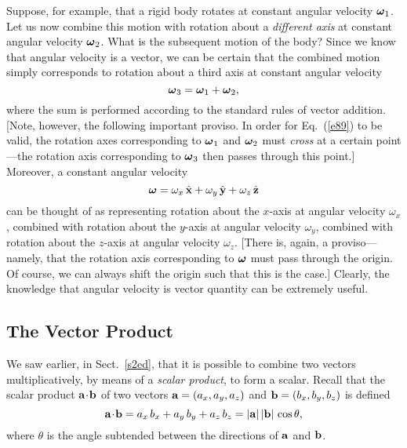 Suppose, for example, that a rigid body rotates at constant angular velocity $\mbox{\boldmath$\omega$}_1$.
Let us now combine this motion with rotation about a {\em different axis} at constant
angular velocity $\mbox{\boldmath$\omega$}_2$. What is the subsequent motion of the body? Since we know
that angular velocity is a vector, we can be certain that the combined motion simply
corresponds to rotation about a third axis at constant angular velocity
\begin{equation}
\mbox{\boldmath$\omega$}_3 = \mbox{\boldmath$\omega$}_1 + \mbox{\boldmath$\omega$}_2,\label{e89}
\end{equation}
where the sum is performed according to the standard rules of vector addition. [Note, however,
the following important proviso. In order for Eq.~(\ref{e89}) to be valid, the rotation
axes corresponding to $\mbox{\boldmath$\omega$}_1$ and $\mbox{\boldmath$\omega$}_2$ must {\em cross} at a certain
point---the rotation axis corresponding to $\mbox{\boldmath$\omega$}_3$ then passes through this point.]
 Moreover,
a  constant angular velocity
\begin{equation}
\mbox{\boldmath$\omega$} = \omega_x\,\hat{\bf x} + \omega_y\,\hat{\bf y} + \omega_z\,\hat{\bf z}
\end{equation}
can be thought of as representing rotation about the $x$-axis at angular velocity $\omega_x$,
combined with rotation about the $y$-axis at angular velocity $\omega_y$, combined with
rotation about the $z$-axis at angular velocity $\omega_z$. [There is, again, a proviso---namely,
that the rotation axis corresponding to $\mbox{\boldmath$\omega$}$ must pass through the origin. Of course,
we can always shift the origin such that this is the case.]
 Clearly, the knowledge that
angular velocity is vector quantity can be extremely useful.

\subsection{The Vector Product}\label{svp}
We saw earlier, in Sect.~\ref{s2ed}, that it is possible to combine two vectors  multiplicatively, 
by means of a {\em scalar product}, to
form a scalar. Recall that the scalar product ${\bf a}\!\cdot\!{\bf b}$
of two vectors ${\bf a}=(a_x,a_y,a_z)$ and ${\bf b}=(b_x,b_y,b_z)$ is defined
\begin{equation}\label{dsp}
{\bf a} \!\cdot\!{\bf b} = a_x\,b_x+ a_y\,b_y + a_z\,b_z = |{\bf a}|\,|{\bf b}|\,\cos\theta,
\end{equation}
where $\theta$ is the angle subtended between the directions of ${\bf a}$ and ${\bf b}$. 

